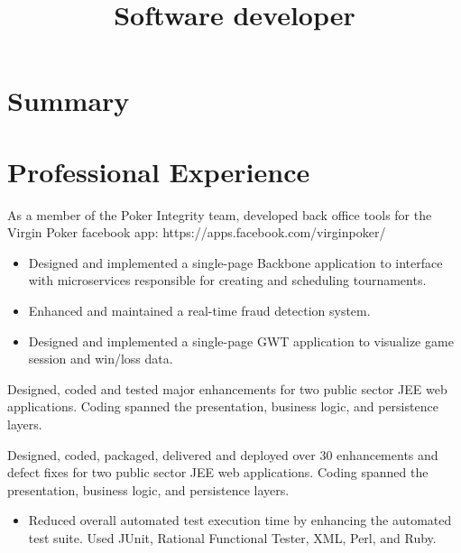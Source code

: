 \documentclass[11pt,letterpaper,sans]{moderncv}   %
\title{Software developer}               %
\begin{document}
\maketitle

\section{Summary}

\section{Professional Experience}
{As a member of the Poker Integrity team, developed back office tools for the Virgin Poker facebook app: https://apps.facebook.com/virginpoker/
{\begin{itemize}
\item Designed and implemented a single-page Backbone application to interface with microservices responsible for
creating and scheduling tournaments.
\item Enhanced and maintained a real-time fraud detection system.
\item Designed and implemented a single-page GWT application to visualize game session and win/loss data.
\end{itemize}}}
\smallskip

{Designed, coded and tested major enhancements for two public sector
JEE web applications.
Coding spanned the presentation, business logic, and persistence layers.}
\smallskip

{Designed, coded, packaged, delivered and deployed over 30 enhancements
and defect fixes for two public sector JEE web applications.
Coding spanned the presentation, business logic, and persistence layers.
{\begin{itemize}
\item 
Reduced overall automated test execution time by enhancing the automated test suite.
Used JUnit, Rational Functional Tester, XML, Perl, and Ruby.
\end{itemize}}}
\smallskip
\end{document}
